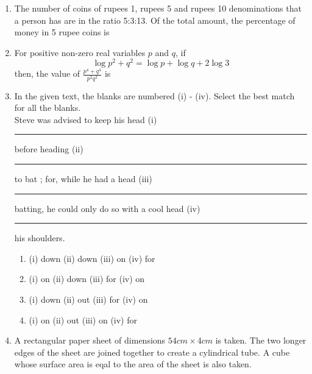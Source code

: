 \documentclass[journal]{IEEEtran}
\begin{document}
\begin{enumerate}
\begin{enumerate}
		\end{enumerate}
	\item The number of coins of rupees 1, rupees 5 and rupees 10 denominations that a person has are in the ratio 5:3:13. Of the total amount, the percentage of money in 5 rupee coins is
		\begin{enumerate}
		\end{enumerate}
	\item For positive non-zero real variables $p$ and $q$, if 
		$$ \log{p^2 + q^2} = \log{p} + \log{q} + 2 \log{3} $$
		then, the value of $\frac{p^4 + q^4}{p^2 q^2}$ is
		\begin{enumerate}
				\begin{multicols}{4}
				\item 79
				\item 81
				\item 9
				\item 83
				\end{multicols}
		\end{enumerate}
	\item In the given text, the blanks are numbered (i) - (iv). Select the best match for all the blanks. \\
		Steve was advised to keep his head (i) \rule{1cm}{0.1pt} before heading (ii) \rule{1cm}{0.1pt} to bat ; for, while he had a head (iii) \rule{1cm}{0.1pt} batting, he could only do so with a cool head (iv) \rule{1cm}{0.1pt} his shoulders.
		\begin{enumerate}
			\item (i) down (ii) down (iii) on (iv) for
			\item (i) on (ii) down (iii) for (iv) on
			\item (i) down (ii) out (iii) for (iv) on
			\item (i) on (ii) out (iii) on (iv) for
		\end{enumerate}
	\item A rectangular paper sheet of dimensions $ 54 cm \times 4 cm$ is taken. The two longer edges of the sheet are joined together to create a cylindrical tube. A cube whose surface area is eqal to the area of the sheet is also taken. \\

\end{enumerate}
\end{document}
